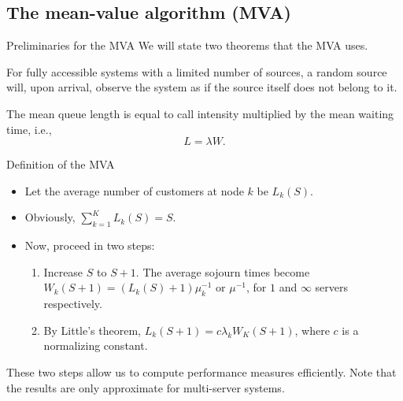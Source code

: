 \documentclass[serif, xcolor={svgnames, table}, usepdftitle=false]{beamer}
\begin{document}
\subsection{The mean-value algorithm (MVA)}
\begin{frame}{Preliminaries for the MVA}
  We will state two theorems that the MVA uses.

  \begin{theorem}
    For fully accessible systems with a limited number of sources, a random
    source will, upon arrival, observe the system as if the source itself does
    not belong to it.
  \end{theorem}

  \begin{theorem}[Little]
    The mean queue length is equal to call intensity multiplied by the mean
    waiting time, i.e.,
    \begin{equation*}
      L = \lambda  W\text{.}
    \end{equation*}
  \end{theorem}
\end{frame}

\begin{frame}{Definition of the MVA}
  \begin{itemize}
  \item Let the average number of customers at node $k$ be $L_k(S)$.
  \item Obviously, $\sum\nolimits_{k = 1}^{K} L_k(S) = S$.
  \item Now, proceed in two steps:
    \begin{enumerate}
    \item Increase $S$ to $S + 1$.  The average sojourn times become
      $W_k(S + 1) = (L_k(S) + 1) \mu_k^{-1}$ or $\mu^{-1}$, for $1$ and $\infty$
      servers respectively.
    \item By Little's theorem, $L_k(S + 1) = c \lambda_k W_K(S + 1)$, where $c$
      is a normalizing constant.
    \end{enumerate}
  \end{itemize}

  These two steps allow us to compute performance measures efficiently.  Note
  that the results are only approximate for multi-server systems.
\end{frame}
\end{document}
